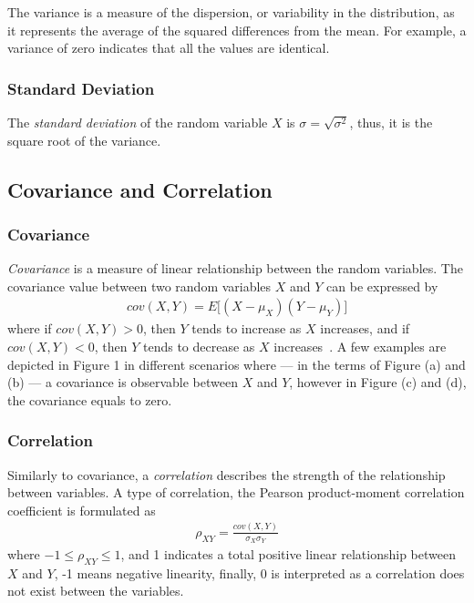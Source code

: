 The variance is a measure of the dispersion, or variability in the distribution, as it represents the average of the squared differences from the mean. For example, a variance of zero indicates that all the values are identical.

\subsubsection{Standard Deviation}

The \textit{standard deviation} of the random variable $X$ is $\sigma = \sqrt{\sigma^2}$, thus, it is the square root of the variance.

\subsection{Covariance and Correlation}

\subsubsection{Covariance}
\textit{Covariance} is a measure of linear relationship between the random variables. The covariance value between two random variables $X$ and $Y$ can be expressed by
\begin{align}
	cov(X,Y) = E\big[(X - \mu_X)(Y - \mu_Y)\big]
\end{align}
where if $cov(X,Y) > 0$, then $Y$ tends to increase as $X$ increases, and if $cov(X,Y) < 0$, then  $Y$ tends to decrease as $X$ increases~\cite{covariance}. A few examples are depicted in Figure 1 %
in different scenarios where --- in the terms of Figure (a) and (b) --- a covariance is observable between $X$ and $Y$, however in Figure (c) and (d), the covariance equals to zero.

\subsubsection{Correlation}
Similarly to covariance, a \textit{correlation} describes the strength of the relationship between variables. A type of correlation, the Pearson product-moment correlation coefficient is formulated as
\begin{align}
	\rho_{XY} = \frac{cov(X, Y)}{\sigma_X\sigma_Y}
\end{align}
where $ -1 \leq \rho_{XY} \leq 1$, and 1 indicates a total positive linear relationship between $X$ and $Y$, -1 means negative linearity, finally, 0 is interpreted as a correlation does not exist between the variables.

